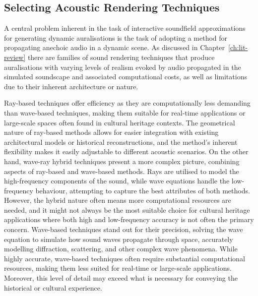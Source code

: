 \subsection{Selecting Acoustic Rendering Techniques}
A central problem inherent in the task of interactive soundfield approximations for generating dynamic auralisations is the task of adopting a method for propagating anechoic audio in a dynamic scene. As discussed in Chapter~\ref{ch:lit-review} there are families of sound rendering techniques that produce auralisations with varying levels of realism evoked by audio propagated in the simulated soundscape and associated computational costs, as well as limitations due to their inherent architecture or nature.\par
Ray-based techniques offer efficiency as they are computationally less demanding than wave-based techniques, making them suitable for real-time applications or large-scale spaces often found in cultural heritage contexts. The geometrical nature of ray-based methods allows for easier integration with existing architectural models or historical reconstructions, and the method's inherent flexibility makes it easily adjustable to different acoustic scenarios. %
On the other hand, wave-ray hybrid techniques present a more complex picture, combining aspects of ray-based and wave-based methods. Rays are utilised to model the high-frequency components of the sound, while wave equations handle the low-frequency behaviour, attempting to capture the best attributes of both methods. However, the hybrid nature often means more computational resources are needed, and it might not always be the most suitable choice for cultural heritage applications where both high and low-frequency accuracy is not often the primary concern.  %
Wave-based techniques stand out for their precision, solving the wave equation to simulate how sound waves propagate through space, accurately modelling diffraction, scattering, and other complex wave phenomena. While highly accurate, wave-based techniques often require substantial computational resources, making them less suited for real-time or large-scale applications. Moreover, this level of detail may exceed what is necessary for conveying the historical or cultural experience.
